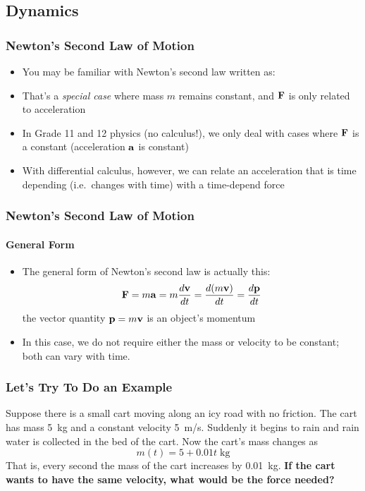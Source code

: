 \documentclass[12pt,compress,aspectratio=169]{beamer}
\newcommand{\mb}[1]{\ensuremath\mathbf{#1}}
\begin{document}
\subsection{Dynamics}
\begin{frame}
  \frametitle{Newton's Second Law of Motion}
  \begin{itemize}
  \item You may be familiar with Newton's second law written as:

    \vspace{-.1in}{\large
      \begin{displaymath}
        \mb{F}=m\mb{a}=m\frac{d\mb{v}}{dt}=m\frac{d^2\mb{s}}{dt}
      \end{displaymath}
    }
  \item That's a \emph{special case} where mass $m$ remains constant, and
    $\mb{F}$ is only related to acceleration
  \item In Grade 11 and 12 physics (no calculus!), we only deal with
    cases where $\mb{F}$ is a constant (acceleration $\mb{a}$ is constant)
  \item With differential calculus, however, we can relate an acceleration
    that is time depending (i.e.\ changes with time) with a time-depend force
  \end{itemize}
\end{frame}

\begin{frame}
  \frametitle{Newton's Second Law of Motion}
  \framesubtitle{General Form}
  \begin{itemize}
  \item The general form of Newton's second law is actually this:
    {\large 
      \begin{displaymath}
        \mb{F}=m\mb{a}=m\frac{d\mb{v}}{dt}=\frac{d(m\mb{v})}{dt}=
        \frac{d\mb{p}}{dt}
      \end{displaymath}
    }
    the vector quantity $\mb{p}=m\mb{v}$ is an object's momentum
  \item In this case, we do not require either the mass or velocity to be
    constant; both can vary with time.
  \end{itemize}
\end{frame}


\begin{frame}
  \frametitle{Let's Try To Do an Example}
  Suppose there is a small cart moving along an icy road with no friction. The
  cart has mass \SI{5}{kg} and a constant velocity \SI{5}{m/s}.
  Suddenly it begins to rain and rain water is collected in the bed of the
  cart. Now the cart's mass changes as
  \begin{displaymath}
    m(t)=5+0.01t\;\si{\kg}
  \end{displaymath}
  That is, every second the mass of the cart increases by \SI{0.01}{\kg}.
  \textbf{If the cart wants to have the same velocity, what would be the force
    needed?}
\end{frame}
\end{document}
